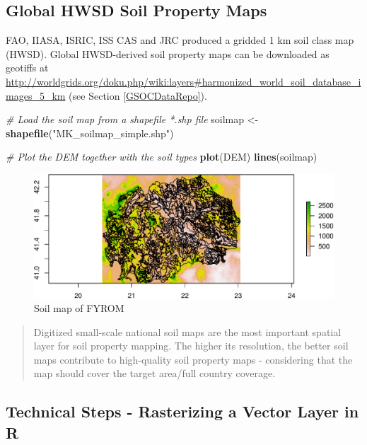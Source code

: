 \documentclass[10pt,b5paper,]{book}
\newenvironment{Shaded}{\begin{snugshade}}{\end{snugshade}}
\newcommand{\CommentTok}[1]{\textcolor[rgb]{0.56,0.35,0.01}{\textit{#1}}}
\newcommand{\KeywordTok}[1]{\textcolor[rgb]{0.13,0.29,0.53}{\textbf{#1}}}
\newcommand{\NormalTok}[1]{#1}
\newcommand{\StringTok}[1]{\textcolor[rgb]{0.31,0.60,0.02}{#1}}
\theoremstyle{definition}
\theoremstyle{definition}
\theoremstyle{definition}
\theoremstyle{remark}
\begin{document}
\hypertarget{global-hwsd-soil-property-maps}{%
\subsection{Global HWSD Soil Property
Maps}\label{global-hwsd-soil-property-maps}}

FAO, IIASA, ISRIC, ISS CAS and JRC produced a gridded 1 km soil class
map (HWSD). Global HWSD-derived soil property maps can be downloaded as
geotiffs at
\url{http://worldgrids.org/doku.php/wiki:layers\#harmonized_world_soil_database_images_5_km}
(see Section \ref{GSOCDataRepo}).

\begin{Shaded}
\begin{Highlighting}[]
\CommentTok{# Load the soil map from a shapefile *.shp file}
\NormalTok{soilmap <-}\StringTok{ }\KeywordTok{shapefile}\NormalTok{(}\StringTok{"MK_soilmap_simple.shp"}\NormalTok{)}

\CommentTok{# Plot the DEM together with the soil types}
\KeywordTok{plot}\NormalTok{(DEM)}
\KeywordTok{lines}\NormalTok{(soilmap)}
\end{Highlighting}
\end{Shaded}

\begin{figure}
\centering
\includegraphics{SOCMapping_files/figure-latex/unnamed-chunk-19-1.pdf}
\caption{\label{fig:unnamed-chunk-19}Soil map of FYROM}
\end{figure}

\begin{quote}
Digitized small-scale national soil maps are the most important spatial
layer for soil property mapping. The higher its resolution, the better
soil maps contribute to high-quality soil property maps - considering
that the map should cover the target area/full country coverage.
\end{quote}

\hypertarget{technical-steps---rasterizing-a-vector-layer-in-r}{%
\subsection{Technical Steps - Rasterizing a Vector Layer in
R}\label{technical-steps---rasterizing-a-vector-layer-in-r}}
\end{document}
